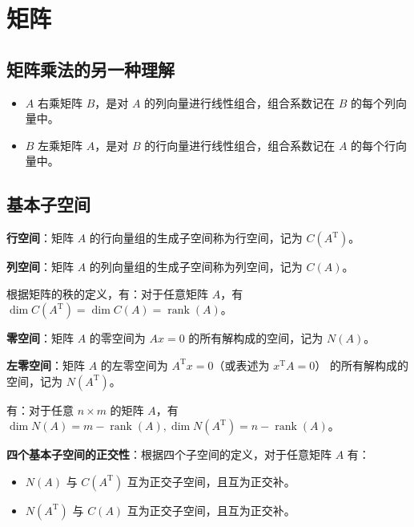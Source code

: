 \section{矩阵}

\subsection{矩阵乘法的另一种理解}

\begin{itemize}
    \item $A$ 右乘矩阵 $B$，是对 $A$ 的列向量进行线性组合，组合系数记在 $B$ 的每个列向量中。
    \item $B$ 左乘矩阵 $A$，是对 $B$ 的行向量进行线性组合，组合系数记在 $A$ 的每个行向量中。
\end{itemize}

\subsection{基本子空间}

\begin{tcolorbox}
    \textbf{行空间}：矩阵 $A$ 的行向量组的生成子空间称为行空间，记为 $C(A^{\mathrm{T}})$。

    \textbf{列空间}：矩阵 $A$ 的列向量组的生成子空间称为列空间，记为 $C(A)$。
\end{tcolorbox}
\begin{tcolorbox}
    根据矩阵的秩的定义，有：对于任意矩阵 $A$，有 $\dim C(A^{\mathrm{T}})=\dim C(A)=\operatorname{rank}(A)$。
\end{tcolorbox}

\begin{tcolorbox}
    \textbf{零空间}：矩阵 $A$ 的零空间为 $Ax=0$ 的所有解构成的空间，记为 $N(A)$。

    \textbf{左零空间}：矩阵 $A$ 的左零空间为 $A^{\mathrm{T}}x=0$（或表述为 $x^{\mathrm{T}}A=0$） 的所有解构成的空间，记为 $N(A^{\mathrm{T}})$。
\end{tcolorbox}

\begin{tcolorbox}
    有：对于任意 $n\times m$ 的矩阵 $A$，有 $\dim N(A)=m-\operatorname{rank}(A),\dim N(A^{\mathrm{T}})=n-\operatorname{rank}(A)$。
\end{tcolorbox}

\begin{tcolorbox}
    \textbf{四个基本子空间的正交性}：根据四个子空间的定义，对于任意矩阵 $A$ 有：
    \begin{itemize}
        \item $N(A)$ 与 $C(A^{\mathrm{T}})$ 互为正交子空间，且互为正交补。
        \item $N(A^{\mathrm{T}})$ 与 $C(A)$ 互为正交子空间，且互为正交补。
    \end{itemize}

\end{tcolorbox}

